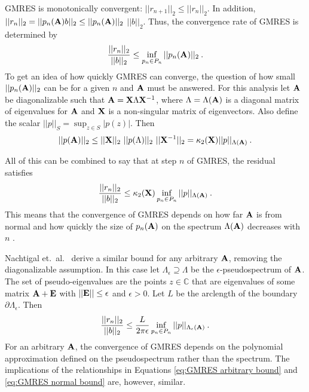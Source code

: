GMRES is monotonically convergent: $||r_{n+1}||_{2} \le ||r_{n}||_{2}$. In addition, $||r_{n}||_{2} = ||p_{n}(\mathbf{A})b||_{2} \le ||p_{n}(\mathbf{A})||_{2}$ $||b||_{2}$. Thus, the convergence rate of GMRES is determined by
%
\begin{equation}
  \frac{||r_{n}||_{2}}{||b||_{2}} \le \inf_{p_{n}\in P_{n}} ||p_{n}(\mathbf{A})||_{2} \:.
\end{equation}
%
To get an idea of how quickly GMRES can converge, the question of how small $||p_{n}(\mathbf{A})||_{2}$ can be for a given $n$ and $\mathbf{A}$ must be answered. For this analysis let $\mathbf{A}$ be diagonalizable such that $\mathbf{A}=\mathbf{X} \Lambda \mathbf{X}^{-1}$, where $\Lambda = \Lambda(\mathbf{A})$ is a diagonal matrix of eigenvalues for $\mathbf{A}$ and $\mathbf{X}$ is a non-singular matrix of eigenvectors. Also define the scalar $||p||_{S} = \sup_{z\in S} |p(z)|$. Then \cite{Trefethen1997}
%
\begin{equation}
  ||p(\mathbf{A})||_{2} \le ||\mathbf{X}||_{2} \text{ } ||p(\Lambda)||_{2} \text{ } ||\mathbf{X}^{-1}||_{2} = \kappa_{2}(\mathbf{X}) ||p||_{\Lambda(\mathbf{A})} \:.
\end{equation}

All of this can be combined to say that at step $n$ of GMRES, the residual satisfies
%
\begin{equation}
  \frac{||r_{n}||_{2}}{||b||_{2}} \le \kappa_{2}(\mathbf{X})  \inf_{p_{n}\in P_{n}} ||p||_{\Lambda(\mathbf{A})} \:.
  \label{eq:GMRES normal bound}
\end{equation}
%
This means that the convergence of GMRES depends on how far $\mathbf{A}$ is from normal and how quickly the size of $p_{n}(\mathbf{A})$ on the spectrum $\Lambda(\mathbf{A})$ decreases with $n$ \cite{Trefethen1997}. 

Nachtigal et.\ al.\ \cite{Nachtigal1992} derive a similar bound for any arbitrary $\mathbf{A}$, removing the diagonalizable assumption. In this case let $\Lambda_{\epsilon} \supseteq \Lambda$ be the $\epsilon$-pseudospectrum of $\mathbf{A}$. The set of pseudo-eigenvalues are the points $z \in \mathbb{C}$ that are eigenvalues of some matrix $\mathbf{A} + \mathbf{E}$ with $||\mathbf{E}|| \le \epsilon$ and $\epsilon > 0$. Let $L$ be the arclength of the boundary $\partial \Lambda_{\epsilon}$. Then
%
\begin{equation}
  \frac{||r_{n}||_{2}}{||b||_{2}} \le \frac{L}{2 \pi \epsilon} \inf_{p_{n}\in P_{n}} ||p||_{\Lambda_{\epsilon}(\mathbf{A})} \:.
  \label{eq:GMRES arbitrary bound}
\end{equation}
%
For an arbitrary $\mathbf{A}$, the convergence of GMRES depends on the polynomial approximation defined on the pseudospectrum rather than the spectrum. The implications of the relationships in Equations \eqref{eq:GMRES arbitrary bound} and \eqref{eq:GMRES normal bound} are, however, similar.

